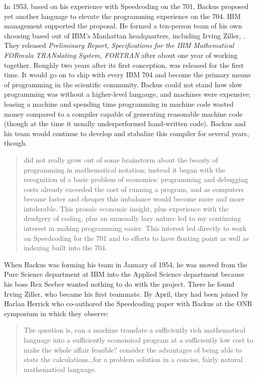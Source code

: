 In 1953, based on his experience with Speedcoding on the 701, Backus proposed yet another language to elevate the programming experience on the 704.
IBM management supported the proposal.
He formed a ten-person team of his own choosing based out of IBM's Manhattan headquarters,
including Irving Ziller, .
They released \textit{Preliminary Report, Specifications for the IBM Mathematical FORmula TRANslating System, FORTRAN}\cite{IBM_1954_FORTRAN_Specifications}
after about one year of working together.
Roughly two years after its first conception, \FTN{} was released for the first time.
It would go on to ship with every IBM 704 and become the primary means
of programming in the scientific community.
Backus could not stand how slow programming was without a higher-level langauge, and
machines were expensive; leasing a machine and spending time programming in machine code
wasted money compared to a compiler capable of generating reasonable machine code
(though at the time it usually underperformed hand-written code).
Backus and his team would continue to develop and stabalize this compiler for several years,
though.

\begin{quotation}
\FTN{} did not really grow out of some brainstorm about the beauty of
programming in mathematical notation; instead it began with the recognition 
of a basic problem of economics: programming and debugging costs already
exceeded the cost of running a program, and as computers became faster
and cheaper this imbalance would become more and more intolerable. This
prosaic economic insight, plus experience with the drudgery of coding, plus
an unusually lazy nature led to my continuing interest in making programming easier.
This interest led directly to work on Speedcoding for the 701
and to efforts to have floating point as well as indexing built into the 704.
\cite{Backus_1980_Programming_in_America_in_1950s}
\end{quotation}

When Backus was forming his team in January of 1954, he was moved from the Pure Science department at IBM into the
Applied Science department because his boss Rex Seeber wanted nothing to do with the project.
There he found Irving Ziller, who became his first teammate.
By April, they had been joined by Harlan Herrick who co-authored the Speedcoding paper with Backus at the ONR symposium
in which they observe:

\begin{quotation}
The question is, can a machine translate a sufficiently rich mathematical 
language into a sufficiently economical program at a sufficiently low cost to 
make the whole affair feasible?  consider the advantages of being able to state 
the calculations\dots for a problem solution in a concise, fairly natural 
mathematical language. 
\end{quotation}

